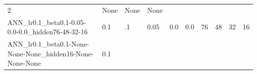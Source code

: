 \documentclass[11pt, a4paper , landscape]{article}
\begin{document}
\begin{longtable}[]{@{}llllllllll@{}}
\begin{minipage}[t]{0.10\columnwidth}
2\strut
\end{minipage} & \begin{minipage}[t]{0.10\columnwidth}\raggedright\strut
None\strut
\end{minipage} & \begin{minipage}[t]{0.09\columnwidth}\raggedright\strut
None\strut
\end{minipage} & \begin{minipage}[t]{0.11\columnwidth}\raggedright\strut
None\strut
\end{minipage}\tabularnewline
\begin{minipage}[t]{0.04\columnwidth}\raggedright\strut
ANN\_lr0.1\_beta0.1-0.05-0.0-0.0\_hidden76-48-32-16\strut
\end{minipage} & \begin{minipage}[t]{0.09\columnwidth}\raggedright\strut
0.1\strut
\end{minipage} & \begin{minipage}[t]{0.04\columnwidth}\raggedright\strut
.1\strut
\end{minipage} & \begin{minipage}[t]{0.05\columnwidth}\raggedright\strut
0.05\strut
\end{minipage} & \begin{minipage}[t]{0.05\columnwidth}\raggedright\strut
0.0\strut
\end{minipage} & \begin{minipage}[t]{0.05\columnwidth}\raggedright\strut
0.0\strut
\end{minipage} & \begin{minipage}[t]{0.10\columnwidth}\raggedright\strut
76\strut
\end{minipage} & \begin{minipage}[t]{0.10\columnwidth}\raggedright\strut
48\strut
\end{minipage} & \begin{minipage}[t]{0.09\columnwidth}\raggedright\strut
32\strut
\end{minipage} & \begin{minipage}[t]{0.11\columnwidth}\raggedright\strut
16\strut
\end{minipage}\tabularnewline
\begin{minipage}[t]{0.04\columnwidth}\raggedright\strut
ANN\_lr0.1\_beta0.1-None-None-None\_hidden16-None-None-None\strut
\end{minipage} & \begin{minipage}[t]{0.09\columnwidth}\raggedright\strut
0.1\strut
\end{minipage} & \begin{minipage}[t]{0.04\columnwidth}\raggedright\strut

\end{minipage}
\end{longtable}
\end{document}
